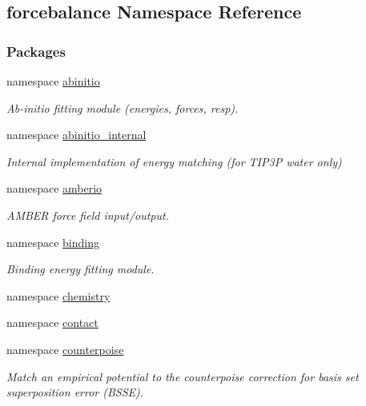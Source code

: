 \hypertarget{namespaceforcebalance}{\subsection{forcebalance \-Namespace \-Reference}
\label{namespaceforcebalance}
}
\subsubsection*{\-Packages}
\begin{DoxyCompactItemize}
\item 
namespace \hyperlink{namespaceforcebalance_1_1abinitio}{abinitio}
\begin{DoxyCompactList}\small\item\em \-Ab-\/initio fitting module (energies, forces, resp). \end{DoxyCompactList}\item 
namespace \hyperlink{namespaceforcebalance_1_1abinitio__internal}{abinitio\-\_\-internal}
\begin{DoxyCompactList}\small\item\em \-Internal implementation of energy matching (for \-T\-I\-P3\-P water only) \end{DoxyCompactList}\item 
namespace \hyperlink{namespaceforcebalance_1_1amberio}{amberio}
\begin{DoxyCompactList}\small\item\em \-A\-M\-B\-E\-R force field input/output. \end{DoxyCompactList}\item 
namespace \hyperlink{namespaceforcebalance_1_1binding}{binding}
\begin{DoxyCompactList}\small\item\em \-Binding energy fitting module. \end{DoxyCompactList}\item 
namespace \hyperlink{namespaceforcebalance_1_1chemistry}{chemistry}
\item 
namespace \hyperlink{namespaceforcebalance_1_1contact}{contact}
\item 
namespace \hyperlink{namespaceforcebalance_1_1counterpoise}{counterpoise}
\begin{DoxyCompactList}\small\item\em \-Match an empirical potential to the counterpoise correction for basis set superposition error (\-B\-S\-S\-E). \end{DoxyCompactList}\item 

\end{DoxyCompactItemize}
